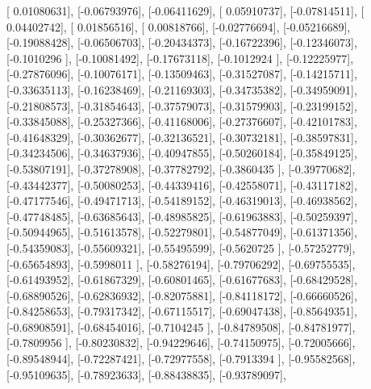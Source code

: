 \documentclass{article}
\begin{document}
       [ 0.01080631],
       [-0.06793976],
       [-0.06411629],
       [ 0.05910737],
       [-0.07814511],
       [ 0.04402742],
       [ 0.01856516],
       [ 0.00818766],
       [-0.02776694],
       [-0.05216689],
       [-0.19088428],
       [-0.06506703],
       [-0.20434373],
       [-0.16722396],
       [-0.12346073],
       [-0.1010296 ],
       [-0.10081492],
       [-0.17673118],
       [-0.1012924 ],
       [-0.12225977],
       [-0.27876096],
       [-0.10076171],
       [-0.13509463],
       [-0.31527087],
       [-0.14215711],
       [-0.33635113],
       [-0.16238469],
       [-0.21169303],
       [-0.34735382],
       [-0.34959091],
       [-0.21808573],
       [-0.31854643],
       [-0.37579073],
       [-0.31579903],
       [-0.23199152],
       [-0.33845088],
       [-0.25327366],
       [-0.41168006],
       [-0.27376607],
       [-0.42101783],
       [-0.41648329],
       [-0.30362677],
       [-0.32136521],
       [-0.30732181],
       [-0.38597831],
       [-0.34234506],
       [-0.34637936],
       [-0.40947855],
       [-0.50260184],
       [-0.35849125],
       [-0.53807191],
       [-0.37278908],
       [-0.37782792],
       [-0.3860435 ],
       [-0.39770682],
       [-0.43442377],
       [-0.50080253],
       [-0.44339416],
       [-0.42558071],
       [-0.43117182],
       [-0.47177546],
       [-0.49471713],
       [-0.54189152],
       [-0.46319013],
       [-0.46938562],
       [-0.47748485],
       [-0.63685643],
       [-0.48985825],
       [-0.61963883],
       [-0.50259397],
       [-0.50944965],
       [-0.51613578],
       [-0.52279801],
       [-0.54877049],
       [-0.61371356],
       [-0.54359083],
       [-0.55609321],
       [-0.55495599],
       [-0.5620725 ],
       [-0.57252779],
       [-0.65654893],
       [-0.5998011 ],
       [-0.58276194],
       [-0.79706292],
       [-0.69755535],
       [-0.61493952],
       [-0.61867329],
       [-0.60801465],
       [-0.61677683],
       [-0.68429528],
       [-0.68890526],
       [-0.62836932],
       [-0.82075881],
       [-0.84118172],
       [-0.66660526],
       [-0.84258653],
       [-0.79317342],
       [-0.67115517],
       [-0.69047438],
       [-0.85649351],
       [-0.68908591],
       [-0.68454016],
       [-0.7104245 ],
       [-0.84789508],
       [-0.84781977],
       [-0.7809956 ],
       [-0.80230832],
       [-0.94229646],
       [-0.74150975],
       [-0.72005666],
       [-0.89548944],
       [-0.72287421],
       [-0.72977558],
       [-0.7913394 ],
       [-0.95582568],
       [-0.95109635],
       [-0.78923633],
       [-0.88438835],
       [-0.93789097],
\end{document}

